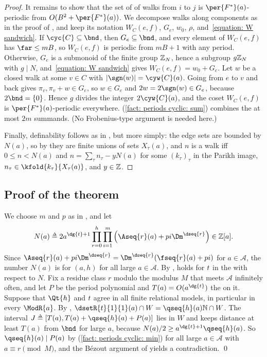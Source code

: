 \begin{proof}
    It remains to show that the set of  of walks from $i$ to $j$ is $\per{F^{*}}(a)$-periodic from $O(B^2 + \per{F^{*}}(a))$.
    We decompose walks along components as in the proof of , and keep its notation $W_C(e, f)$, $G_e$, $w_0$, $\rho$, and~\eqref{equation: W sandwich}.
    If $\cyc{C} \subseteq \bnd$, then $G_e \subseteq \bnd$, and every element of $W_C(e, f)$ has $\far \le m B$, so $W_C(e, f)$ is periodic from $m B + 1$ with any period.
    Otherwise, $G_e$ is a submonoid of the finite group $\mathbb{Z}_N$, hence a subgroup $g \mathbb{Z}_N$ with $g \mid N$, and~\eqref{equation: W sandwich} gives $W_C(e, f) = w_0 + G_e$.
    Let $w$ be a closed walk  at some $v \in C$ with $\abs{\sgn(w)} = \cyw{C}(a)$.
    Going from $e$ to $v$ and back gives $\pi_v, \pi_v + w \in G_e$, so $w \in G_e$ and $2 w = 2 \sgn(w) \in G_e$, because $2 \bnd = \set{0}$.
    Hence $g$ divides the integer $2\cyw{C}(a)$, and the coset $W_C(e, f)$ is $\per{F^{*}}(a)$-periodic everywhere.
    (\ref{fact: periods cyclic: sum}) combines the at most $2m$ summands.
    (No Frobenius-type argument is needed here.)

    Finally, definability follows as in , but more simply: the edge sets are bounded by $N(a)$, so by  they are finite unions of sets $X_\tau(a)$, and $n$ is a walk  iff $0 \le n < N(a)$ and $n = \sum_\tau n_\tau - y N(a)$ for some $(k_\tau)_\tau$ in the Parikh image, $n_\tau \in \kfold{k_\tau}{X_\tau(a)}$, and $y \in \mathbb{Z}$.
\end{proof}

\subsection{Proof of the theorem}
We choose $m$ and $p$ as in , and let
\[N(a) \defeq 2 a^{\dg{\term} + 1} \prod_{r = 0}^{h} \prod_{i = 1}^{m} \left(\Aseq{r}(a) + p i \Dm^{\dseq{r}}\right) \in \inte[a].\]
Since $\Aseq{r}(a) + p i \Dm^{\dseq{r}} = \Dm^{\dseq{r}} (\fseq{r}(a) + p i)$ for $a \in \mathcal{A}$, the number $N(a)$ is  for $(a, h)$ for all large $a \in \mathcal{A}$.
By ,  holds for $\term$ in the  with respect to $N$.
Fix a residue class $r$ modulo the modulus $M$ that meets $\mathcal{A}$ infinitely often, and let $P$ be the period polynomial and $T(a) = O(a^{\dg{\term}})$ the  on it.
Suppose that $\Qt{h}$ and $\term$ agree in all finite relational models, in particular in every $\ModR{a}$.
By , $\dsetR{\term}{1}{1}(a) \cap W = \qseq{h}(a) \nat \cap W$.
The interval $J \defeq \range{T(a), T(a) + \qseq{h}(a) + P(a)}$ lies in $W$ and keeps distance at least $T(a)$ from $\bnd$ for large $a$, because $N(a)/2 \ge a^{\dg{\term} + 1} \qseq{h}(a)$.
So $\qseq{h}(a) \mid P(a)$ by (\ref{fact: periods cyclic: min}) for all large $a \in \mathcal{A}$ with $a \equiv r \pmod M$, and the B\'ezout argument of  yields a contradiction.
\qed

